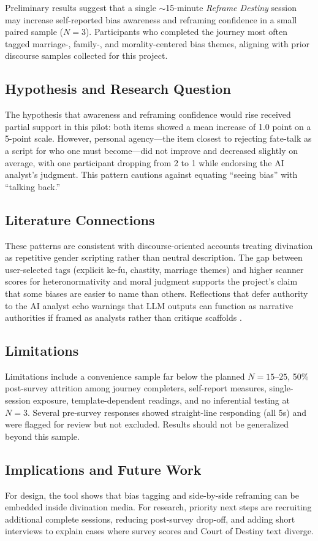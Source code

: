 \documentclass[stu,12pt,floatsintext]{apa7}
\begin{document}
Preliminary results suggest that a single $\sim$15-minute \textit{Reframe Destiny} session may increase self-reported bias awareness and reframing confidence in a small paired sample ($N = 3$). Participants who completed the journey most often tagged marriage-, family-, and morality-centered bias themes, aligning with prior discourse samples collected for this project.

\subsection{Hypothesis and Research Question}

The hypothesis that awareness and reframing confidence would rise received partial support in this pilot: both items showed a mean increase of 1.0 point on a 5-point scale. However, personal agency---the item closest to rejecting fate-talk as a script for who one must become---did not improve and decreased slightly on average, with one participant dropping from 2 to 1 while endorsing the AI analyst's judgment. This pattern cautions against equating ``seeing bias'' with ``talking back.''

\subsection{Literature Connections}

These patterns are consistent with discourse-oriented accounts treating divination as repetitive gender scripting \parencite{butler1990,foucault1972} rather than neutral description. The gap between user-selected tags (explicit ke-fu, chastity, marriage themes) and higher scanner scores for heteronormativity and moral judgment supports the project's claim that some biases are easier to name than others. Reflections that defer authority to the AI analyst echo warnings that LLM outputs can function as narrative authorities if framed as analysts rather than critique scaffolds \parencite{bender2021}.

\subsection{Limitations}

Limitations include a convenience sample far below the planned $N = 15$--$25$, 50\% post-survey attrition among journey completers, self-report measures, single-session exposure, template-dependent readings, and no inferential testing at $N = 3$. Several pre-survey responses showed straight-line responding (all 5s) and were flagged for review but not excluded. Results should not be generalized beyond this sample.

\subsection{Implications and Future Work}

For design, the tool shows that bias tagging and side-by-side reframing can be embedded inside divination media. For research, priority next steps are recruiting additional complete sessions, reducing post-survey drop-off, and adding short interviews to explain cases where survey scores and Court of Destiny text diverge.

\printbibliography
\end{document}
